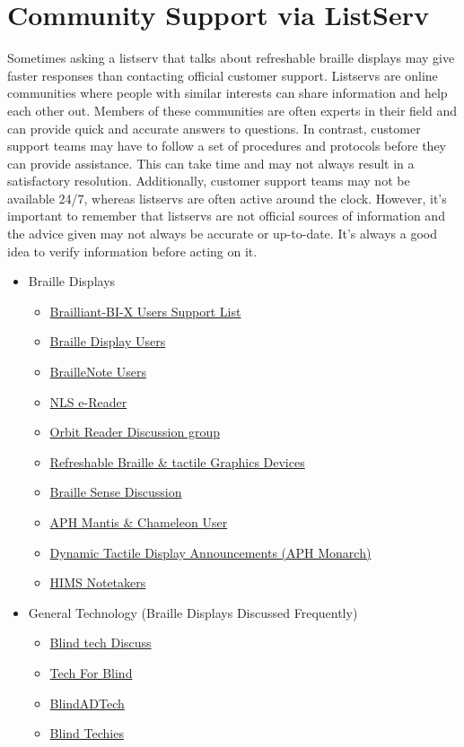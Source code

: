 \section{Community Support via ListServ}\label{listserv2}
Sometimes asking a listserv that talks about refreshable braille displays may give faster responses than contacting official customer support. Listservs are online communities where people with similar interests can share information and help each other out. Members of these communities are often experts in their field and can provide quick and accurate answers to questions. In contrast, customer support teams may have to follow a set of procedures and protocols before they can provide assistance. This can take time and may not always result in a satisfactory resolution. Additionally, customer support teams may not be available 24/7, whereas listservs are often active around the clock. However, it’s important to remember that listservs are not official sources of information and the advice given may not always be accurate or up-to-date. It’s always a good idea to verify information before acting on it.

\begin{itemize}
 \item Braille Displays
 \begin{itemize}
 \item \href{http://groups.io/g/Brailliant-BI-X-USERS/}{Brailliant-BI-X Users Support List}
 \item \href{http://groups.io/g/braille-display-users}{Braille Display Users}
 \item \href{http://groups.io/g/braillenote}{BrailleNote Users}
 \item \href{http://groups.io/g/nlsEReader/messages}{NLS e-Reader}
 \item \href{http://groups.io/g/orbit-reader}{Orbit Reader Discussion group}
 \item \href{http://www.freelists.org/list/braillecell}{Refreshable Braille \& tactile Graphics Devices}
 \item \href{http://www.freelists.org/list/braille-sense}{Braille Sense Discussion}
 \item \href{http://www.freelists.org/list/aphmantischameleonuser}{APH Mantis \& Chameleon User}
 \item \href{http://www.freelists.org/list/aph\_dynamictactiledisplay\_announce}{Dynamic Tactile Display Announcements (APH Monarch)}
 \item \href{http://groups.io/g/hims-notetakers-chat}{HIMS Notetakers}
 \end{itemize}
 \item General Technology (Braille Displays Discussed Frequently)
 \begin{itemize}
 \item \href{http://groups.io/g/blindtechdiscuss/messages}{Blind tech Discuss}
 \item \href{http://groups.io/g/tech-for-blind}{Tech For Blind}
 \item \href{http://groups.io/g/blindadtech}{BlindADTech}
 \item \href{http://groups.io/g/blind-techies/messages}{Blind Techies}
 \end{itemize}
\end{itemize}
